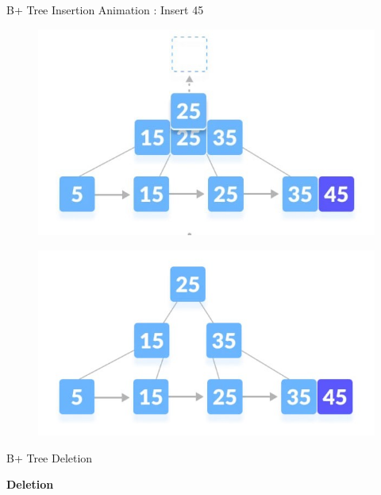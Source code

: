\documentclass{beamer}
\begin{document}
\begin{frame}{B+ Tree Insertion Animation : \alert{Insert 45}}
\begin{table}[h]
\begin{overprint}
\begin{figure}
        \end{figure}
        \begin{figure}
            \centering
            \includegraphics[scale=0.8]{Images/bi5_2_2.jpg}
        \end{figure}
        \begin{figure}
            \centering
            \includegraphics[scale=0.8]{Images/bi5_3.jpg}
        \end{figure}
        \end{overprint}
    \end{table} 
\end{frame}

\begin{frame}{B+ Tree Deletion}
    \begin{table}[]
        \centering
        \alert{\textbf{\huge{Deletion}}}
    \end{table}
\end{frame}
\end{document}
